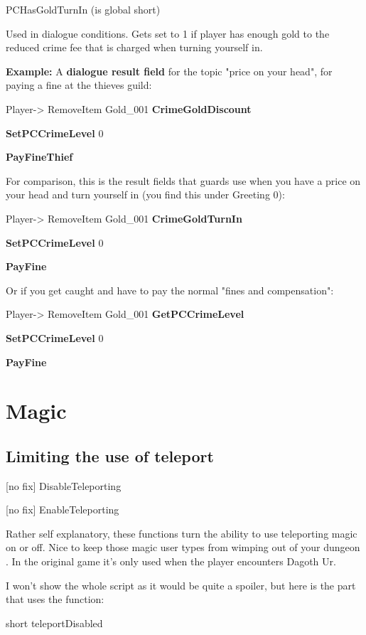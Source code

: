 PCHasGoldTurnIn (is global short)

Used in dialogue conditions. Gets set to 1 if player has enough gold to
the reduced crime fee that is charged when turning yourself in.

\textbf{Example:} A \textbf{dialogue result field} for the topic "price
on your head", for paying a fine at the thieves guild:

Player-> RemoveItem Gold\_001 \textbf{CrimeGoldDiscount}

\textbf{SetPCCrimeLevel} 0

\textbf{PayFineThief}

For comparison, this is the result fields that guards use when you have
a price on your head and turn yourself in (you find this under Greeting
0):

Player-> RemoveItem Gold\_001 \textbf{CrimeGoldTurnIn}

\textbf{SetPCCrimeLevel} 0

\textbf{PayFine}

Or if you get caught and have to pay the normal "fines and
compensation":

Player-> RemoveItem Gold\_001 \textbf{GetPCCrimeLevel}

\textbf{SetPCCrimeLevel} 0

\textbf{PayFine}

\hypertarget{magic}{%
\section{\texorpdfstring{\hfill\break
Magic}{ Magic}}\label{magic}}

\hypertarget{limiting-the-use-of-teleport}{%
\subsection{Limiting the use of
teleport}\label{limiting-the-use-of-teleport}}

{[}no fix{]} DisableTeleporting

{[}no fix{]} EnableTeleporting

Rather self explanatory, these functions turn the ability to use
teleporting magic on or off. Nice to keep those magic user types from
wimping out of your dungeon . In the original game it's only used when
the player encounters Dagoth Ur.

I won't show the whole script as it would be quite a spoiler, but here
is the part that uses the function:

short teleportDisabled

